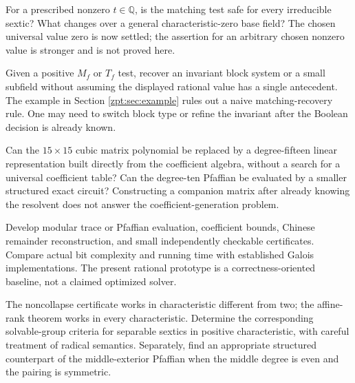 \documentclass[11pt,letterpaper]{article}
\numberwithin{equation}{section}
\theoremstyle{definition}
\theoremstyle{remark}
\newcommand{\QQ}{\mathbb Q}
\begin{document}
\begin{question}
\label{zpt:q:nonzero-safe}
For a prescribed nonzero $t\in\QQ$, is the matching test safe for every
irreducible sextic? What changes over a general characteristic-zero base
field? The chosen universal value zero is now settled; the assertion for
an arbitrary chosen nonzero value is stronger and is not proved here.
\end{question}

\begin{question}
\label{zpt:q:witness}
Given a positive $M_f$ or $T_f$ test, recover an invariant block system or
a small subfield without assuming the displayed rational value has a
single antecedent. The example in Section \ref{zpt:sec:example} rules out a
naive matching-recovery rule. One may need to switch block type or refine
the invariant after the Boolean decision is already known.
\end{question}

\begin{question}
\label{zpt:q:smaller}
Can the $15\times15$ cubic matrix polynomial be replaced by a degree-fifteen
linear representation built directly from the coefficient algebra,
without a search for a universal coefficient table? Can the degree-ten
Pfaffian be evaluated by a smaller structured exact circuit? Constructing
a companion matrix after already knowing the resolvent does not answer
the coefficient-generation problem.
\end{question}

\begin{question}
\label{zpt:q:modular}
Develop modular trace or Pfaffian evaluation, coefficient bounds, Chinese
remainder reconstruction, and small independently checkable certificates.
Compare actual bit complexity and running time with established Galois
implementations. The present rational prototype is a correctness-oriented
baseline, not a claimed optimized solver.
\end{question}

\begin{question}
\label{zpt:q:char}
The noncollapse certificate works in characteristic different from two;
the affine-rank theorem works in every characteristic. Determine the
corresponding solvable-group criteria for separable sextics in positive
characteristic, with careful treatment of radical semantics. Separately,
find an appropriate structured counterpart of the middle-exterior
Pfaffian when the middle degree is even and the pairing is symmetric.
\end{question}
\end{document}
